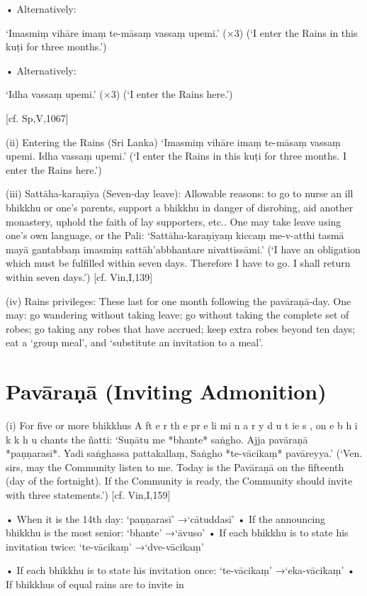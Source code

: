 • Alternatively:

‘Imasmiṃ vihāre
imaṃ te-māsaṃ vassaṃ upemi.’ (×3)
(‘I enter the Rains in this kuṭi for three months.’)

• Alternatively:

‘Idha vassaṃ upemi.’ (×3)
(‘I enter the Rains here.’)

[cf. Sp,V,1067]

(ii) Entering the Rains (Sri Lanka)
‘Imasmiṃ vihāre
imaṃ te-māsaṃ vassaṃ upemi.
Idha vassaṃ upemi.’
(‘I enter the Rains in this kuṭi for three months.
I enter the Rains here.’)

(iii) Sattāha-karaṇīya (Seven-day leave):
Allowable reasons: to go to nurse an ill
bhikkhu or one's parents, support a bhikkhu
in danger of disrobing, aid another monastery, uphold the faith of lay supporters, etc..
One may take leave using one's own language,
or the Pali:
‘Sattāha-karaṇīyaṃ kiccaṃ me-v-atthi
tasmā mayā gantabbaṃ imasmiṃ
sattāh'abbhantare nivattissāmi.’
(‘I have an obligation which must be fulfilled within
seven days. Therefore I have to go. I shall return
within seven days.’)
[cf. Vin,I,139]

(iv) Rains privileges:
These last for one month following the
pavāraṇā-day. One may: go wandering without taking leave; go without taking the complete set of robes; go taking any robes that
have accrued; keep extra robes beyond ten
days; eat a ‘group meal’, and ‘substitute an
invitation to a meal’.

\section{Pavāraṇā (Inviting Admonition)}

(i) For five or more bhikkhus
A ft e r th e pr e li mi n a r y d u t ie s , on e b h i k k h u
chants the ñatti:
‘Suṇātu me *bhante* saṅgho.
Ajja pavāraṇā *paṇṇarasī*.
Yadi saṅghassa pattakallaṃ,
Saṅgho *te-vācikaṃ* pavāreyya.’
(‘Ven. sirs, may the Community listen to me. Today
is the Pavāraṇā on the fifteenth (day of the
fortnight). If the Community is ready, the
Community should invite with three statements.’)
[cf. Vin,I,159]

• When it is the 14th day:
‘paṇṇarasī’ →‘cātuddasī’
• If the announcing bhikkhu is the most senior:
‘bhante’ →‘āvuso’
• If each bhikkhu is to state his invitation twice:
‘te-vācikaṃ’ →‘dve-vācikaṃ’

• If each bhikkhu is to state his invitation once:
‘te-vācikaṃ’ →‘eka-vācikaṃ’
• If bhikkhus of equal rains are to invite in

